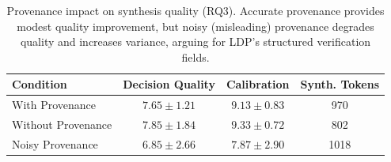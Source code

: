 \begin{table}[t]
\centering
\caption{Provenance impact on synthesis quality (RQ3). Accurate provenance provides modest quality improvement, but noisy (misleading) provenance degrades quality and increases variance, arguing for LDP's structured verification fields.}
\label{tab:provenance}
\begin{tabular}{lccc}
\toprule
Condition & Decision Quality & Calibration & Synth. Tokens \\
\midrule
With Provenance & $7.65 \pm 1.21$ & $9.13 \pm 0.83$ & 970 \\
Without Provenance & $7.85 \pm 1.84$ & $9.33 \pm 0.72$ & 802 \\
Noisy Provenance & $6.85 \pm 2.66$ & $7.87 \pm 2.90$ & 1018 \\
\bottomrule
\end{tabular}
\end{table}